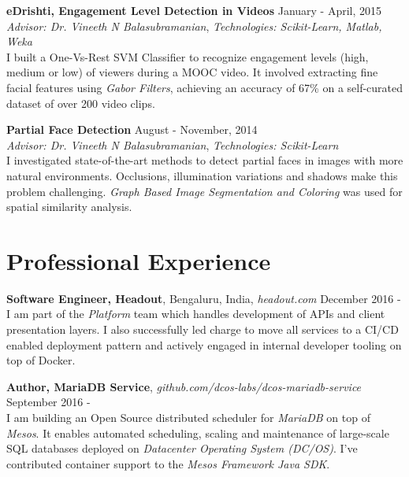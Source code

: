 \documentclass[margin,line]{res}
\begin{document}
\begin{resume}
  \vspace*{-2.5mm}

  {\bf eDrishti, Engagement Level Detection in Videos} \hfill January - April, 2015 \\
  	{\em Advisor: Dr. Vineeth N Balasubramanian}, {\em Technologies: Scikit-Learn, Matlab, Weka} \vspace{0.15 \baselineskip} \\
  	I built a One-Vs-Rest SVM Classifier to recognize engagement levels (high, medium or low) of viewers during a MOOC video. It involved extracting fine facial features using {\it Gabor Filters}, achieving an accuracy of 67\% on a self-curated dataset of over 200 video clips.

  \vspace*{-2.5mm}

  {\bf Partial Face Detection} \hfill August - November, 2014 \\
  	{\em Advisor: Dr. Vineeth N Balasubramanian}, {\em Technologies: Scikit-Learn} \vspace{0.15 \baselineskip} \\
  I investigated state-of-the-art methods to detect partial faces in images with more natural environments. Occlusions, illumination variations and shadows make this problem challenging. {\it Graph Based Image Segmentation and Coloring} was used for spatial similarity analysis.

\section{\sc Professional Experience}

  {\bf Software Engineer, Headout}, Bengaluru, India, {\it headout.com}  \hfill December 2016 - \\
    I am part of the {\it Platform} team which handles development of APIs and client presentation layers. I also successfully led charge to move all services to a CI/CD enabled deployment pattern and actively engaged in internal developer tooling on top of Docker.

  \vspace*{-2.5mm}

  {\bf Author, MariaDB Service}, {\it github.com/dcos-labs/dcos-mariadb-service} \hfill September 2016 - \\
    I am building an Open Source distributed scheduler for {\it MariaDB} on top of {\em Mesos}. It enables automated scheduling, scaling and maintenance of large-scale SQL databases deployed on {\it Datacenter Operating System (DC/OS)}. I've contributed container support to the {\it Mesos Framework Java SDK}.


\end{resume}
\end{document}
